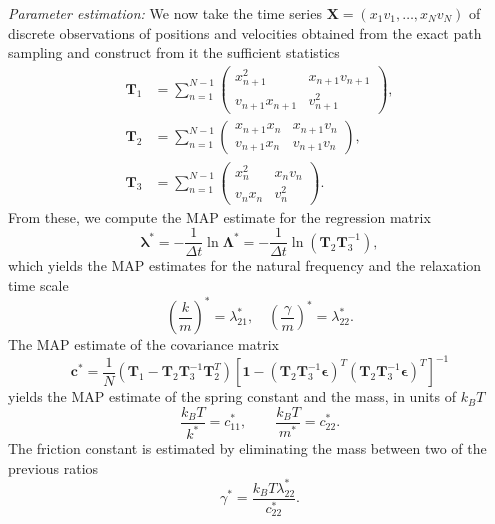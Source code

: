 \documentclass[english,aps, twocolumn, pre,superscriptaddress, notitlepage]{revtex4-1}
\begin{document}
\emph{Parameter estimation: }We now take the time series $\boldsymbol{X}=(x_{1}v_{1},\ldots,x_{N}v_{N})$
of discrete observations of positions and velocities obtained from
the exact path sampling and construct from it the sufficient statistics\begin{subequations}\label{eq:bho-T-matrices}
\begin{alignat}{1}
\boldsymbol{T}_{1} & =\sum_{n=1}^{N-1}\begin{pmatrix}x_{n+1}^{2} & x_{n+1}v_{n+1}\\
v_{n+1}x_{n+1} & v_{n+1}^{2}
\end{pmatrix},\\
\boldsymbol{T}_{2} & =\sum_{n=1}^{N-1}\begin{pmatrix}x_{n+1}x_{n} & x_{n+1}v_{n}\\
v_{n+1}x_{n} & v_{n+1}v_{n}
\end{pmatrix},\\
\boldsymbol{T}_{3} & =\sum_{n=1}^{N-1}\begin{pmatrix}x_{n}^{2} & x_{n}v_{n}\\
v_{n}x_{n} & v_{n}^{2}
\end{pmatrix}.
\end{alignat}
\end{subequations}From these, we compute the MAP estimate for the
regression matrix
\[
\boldsymbol{\lambda}^{\ast}=-\frac{1}{\Delta t}\ln\boldsymbol{\Lambda}^{\ast}=-\frac{1}{\Delta t}\ln(\bm{T}_{2}\boldsymbol{T}_{3}^{-1}),
\]
which yields the MAP estimates for the natural frequency and the relaxation
time scale
\begin{equation}
\left(\frac{k}{m}\right)^{\ast}=\lambda_{21}^{\ast},\quad\left(\frac{\gamma}{m}\right)^{\ast}=\lambda_{22}^{\ast}.
\end{equation}
The MAP estimate of the covariance matrix
\[
\boldsymbol{c}^{\ast}=\dfrac{1}{N}\left(\bm{T}_{1}-\boldsymbol{T}_{2}\boldsymbol{T}_{3}^{-1}\boldsymbol{T}_{2}^{T}\right)\left[\boldsymbol{1}-(\bm{T}_{2}\boldsymbol{T}_{3}^{-1}\boldsymbol{\epsilon})^{T}(\bm{T}_{2}\boldsymbol{T}_{3}^{-1}\boldsymbol{\epsilon})^{T}\right]^{-1}
\]
yields the MAP estimate of the spring constant and the mass, in units
of $k_{B}T$
\begin{equation}
\frac{k_{B}T}{k^{*}}=c_{11}^{\ast},\qquad\frac{k_{B}T}{m^{*}}=c_{22}^{\ast}.
\end{equation}
The friction constant is estimated by eliminating the mass between
two of the previous ratios
\begin{equation}
\gamma^{\ast}=\frac{k_{B}T\lambda_{22}^{\ast}}{c_{22}^{\ast}}.
\end{equation}
\end{document}
